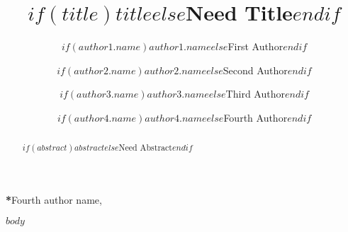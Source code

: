 \documentclass[12pt]{spieman}  %
\title{$if(title)$$title$$else$Need Title$endif$}
\author[$if(author1.affiliation)$$author1.affiliation$$endif$]{$if(author1.name)$$author1.name$$else$First Author$endif$}
\author[$if(author2.affiliation)$$author2.affiliation$$endif$]{$if(author2.name)$$author2.name$$else$Second Author$endif$}
\author[$if(author3.affiliation)$$author3.affiliation$$endif$]{$if(author3.name)$$author3.name$$else$Third Author$endif$}
\author[$if(author4.affiliation)$$author4.affiliation$$endif$]{$if(author4.name)$$author4.name$$else$Fourth Author$endif$}
\affil[a]{$if(affil1)$$affil1$$else$$endif$}
\affil[b]{$if(affil2)$$affil2$$else$$endif$}
\affil[c]{$if(affil3)$$affil3$$else$$endif$}
\affil[d]{$if(affil4)$$affil4$$else$$endif$}
\begin{document}
 
\maketitle

\begin{abstract}
$if(abstract)$$abstract$$else$Need Abstract$endif$
\end{abstract}


{\noindent \footnotesize\textbf{*}Fourth author name,   }

\begin{spacing}{2}   %
$body$
\end{spacing}
\end{document}
